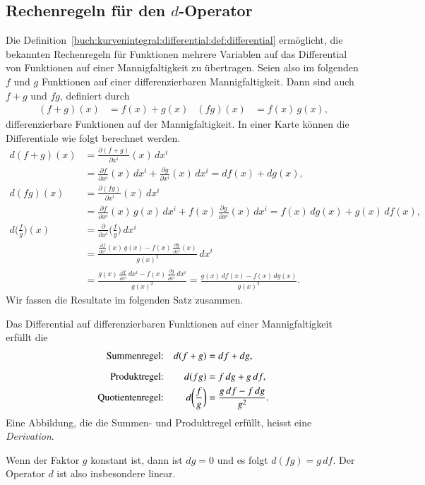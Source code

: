 \subsection{Rechenregeln für den $d$-Operator}
Die Definition~\ref{buch:kurvenintegral:differential:def:differential}
ermöglicht, die bekannten Rechenregeln für Funktionen mehrere Variablen
auf das Differential von Funktionen auf einer Mannigfaltigkeit zu
übertragen.
%
Seien also im folgenden $f$ und $g$ Funktionen auf einer differenzierbaren
Mannigfaltigkeit.
Dann sind auch $f+g$ und $fg$, definiert durch
\begin{align*}
(f+g)(x) &= f(x)+g(x)
&
(fg)(x) &= f(x)\,g(x),
\end{align*}
differenzierbare Funktionen auf der Mannigfaltigkeit.
In einer Karte können die Differentiale wie folgt berechnet werden.
\begin{align*}
d(f+g)(x)
&=
\frac{\partial(f+g)}{\partial x^i}(x)\,dx^i
\\
&=
\frac{\partial f}{\partial x^i}(x)\,dx^i
+
\frac{\partial g}{\partial x^i}(x)\,dx^i
=
df(x) + dg(x),
\\
d(fg)(x)
&=
\frac{\partial (fg)}{\partial x^i}(x)\,dx^i
\\
&=
\frac{\partial f}{\partial x^i}(x)\,g(x)\,dx^i
+
f(x)\,\frac{\partial g}{\partial x^i}(x)\,dx^i
=
f(x)\,dg(x) + g(x)\,df(x),
\\
d\biggl(\frac{f}{g}\biggr)(x)
&=\frac{\partial}{\partial x^i}\biggl(\frac{f}{g}\biggr)\,dx^i
\\
&=
\frac{\displaystyle
\frac{\partial f}{\partial x^i}(x)\,g(x)-f(x)\,\frac{\partial g}{\partial x^i}(x)
}{
g(x)^2
}\,dx^i
\\
&=
\frac{\displaystyle
g(x)\,
\frac{\partial f}{\partial x^i}\,dx^i
-
f(x)\,\frac{\partial g}{\partial x^i}\,dx^i
}{g(x)^2}
=
\frac{g(x)\,df(x)-f(x)\,dg(x)}{g(x)^2}.
\end{align*}
Wir fassen die Resultate im folgenden Satz zusammen.

\begin{satz}
Das Differential auf differenzierbaren Funktionen auf einer
Mannigfaltigkeit erfüllt die
\begin{align*}
\text{Summenregel:}& & d(f+g)&= df + dg, \\[6pt]
\index{Summenregel}%
\text{Produktregel:}& & d(fg) &= f\,dg + g\,df,\\
\index{Produktregel}%
\text{Quotientenregel:}& & d\biggl(\frac{f}{g}\biggr) &= \frac{g\,df - f\,dg}{g^2}.
\index{Quotientenregel}%
\end{align*}
Eine Abbildung, die die Summen- und Produktregel erfüllt, heisst eine
{\em Derivation}.
%
\end{satz}
Wenn der Faktor $g$ konstant ist, dann ist $dg=0$ und es folgt
$d(fg) = g\,df$.
Der Operator $d$ ist also insbesondere linear.

